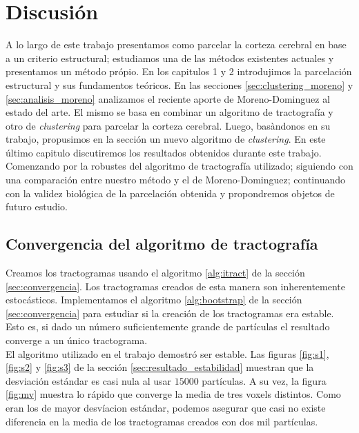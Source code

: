 \chapter{Discusi\'on} 
\label{ch:discusion}

A lo largo de este trabajo presentamos como parcelar la corteza cerebral
en base a un criterio estructural; estudiamos una de las m\'etodos
existentes actuales y presentamos un m\'etodo pr\'opio. En los capitulos
1 y 2 introdujimos la parcelaci\'on estructural y sus fundamentos 
te\'oricos. En las secciones \ref{sec:clustering_moreno} y 
\ref{sec:analisis_moreno} analizamos el reciente aporte de 
Moreno-Dominguez \cite{Moreno-Dominguez2014} al estado del arte. El mismo
se basa en combinar un algoritmo de tractograf\'ia y otro de 
\textit{clustering} para parcelar la corteza cerebral. Luego, bas\`andonos
en su trabajo, propusimos en la secci\'on \label{ch:nuestro} un nuevo
algoritmo de \textit{clustering}. En este \'ultimo capitulo discutiremos
los resultados obtenidos durante este trabajo. Comenzando por la robustes
del algoritmo de tractograf\'ia utilizado; siguiendo con una comparaci\'on
entre nuestro m\'etodo y el de Moreno-Dominguez; continuando con la 
validez biol\'ogica de la parcelaci\'on obtenida y propondremos objetos de
futuro estudio. \\

\section{Convergencia del algoritmo de tractograf\'ia}

Creamos los tractogramas usando el algoritmo \ref{alg:itract} de la 
secci\'on \ref{sec:convergencia}. Los tractogramas creados de esta manera
son inherentemente estoc\'asticos. Implementamos el algoritmo 
\ref{alg:bootstrap} de la secci\'on \ref{sec:convergencia} para estudiar
si la creaci\'on de los tractogramas era estable. Esto es, si dado un 
n\'umero suficientemente grande de part\'iculas el resultado converge
a un \'unico tractograma. \\

El algoritmo utilizado en el trabajo demostr\'o ser estable. Las figuras 
\ref{fig:s1}, \ref{fig:s2} y \ref{fig:s3} de la secci\'on 
\ref{sec:resultado_estabilidad} muestran que la desviaci\'on est\'andar es
casi nula al usar $15000$ part\'iculas. A su vez, la figura \ref{fig:mv}
muestra lo r\'apido que converge la media de tres voxels distintos. 
Como eran los de mayor desv\'iacion est\'andar, podemos asegurar que casi
no existe diferencia en la media de los tractogramas creados con dos mil
part\'iculas. \\

